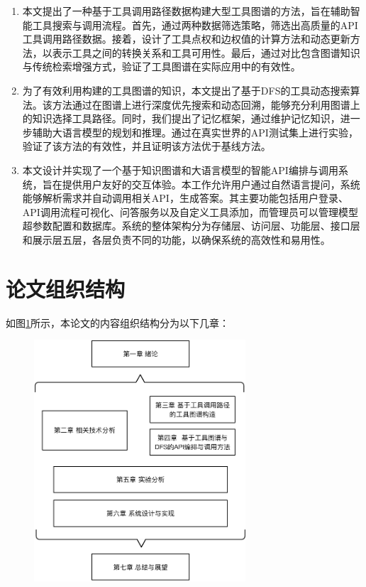 \begin{enumerate}
    \item 本文提出了一种基于工具调用路径数据构建大型工具图谱的方法，旨在辅助智能工具搜索与调用流程。首先，通过两种数据筛选策略，筛选出高质量的API工具调用路径数据。接着，设计了工具点权和边权值的计算方法和动态更新方法，以表示工具之间的转换关系和工具可用性。最后，通过对比包含图谱知识与传统检索增强方式，验证了工具图谱在实际应用中的有效性。
    \item 为了有效利用构建的工具图谱的知识，本文提出了基于DFS的工具动态搜索算法。该方法通过在图谱上进行深度优先搜索和动态回溯，能够充分利用图谱上的知识选择工具路径。同时，我们提出了记忆框架，通过维护记忆知识，进一步辅助大语言模型的规划和推理。通过在真实世界的API测试集上进行实验，验证了该方法的有效性，并且证明该方法优于基线方法。
    \item 本文设计并实现了一个基于知识图谱和大语言模型的智能API编排与调用系统，旨在提供用户友好的交互体验。本工作允许用户通过自然语言提问，系统能够解析需求并自动调用相关API，生成答案。其主要功能包括用户登录、API调用流程可视化、问答服务以及自定义工具添加，而管理员可以管理模型超参数配置和数据库。系统的整体架构分为存储层、访问层、功能层、接口层和展示层五层，各层负责不同的功能，以确保系统的高效性和易用性。
\end{enumerate}

\section{论文组织结构}

如图\ref{fig:ch1-structure}所示，本论文的内容组织结构分为以下几章：

\begin{figure}[!htp]
    \vspace{1em}
    \centering
    \setlength{\abovecaptionskip}{10pt} %
    \includegraphics[height=9cm]{../assets/ch1-论文结构.pdf}
    \label{fig:ch1-structure}
  \end{figure}

